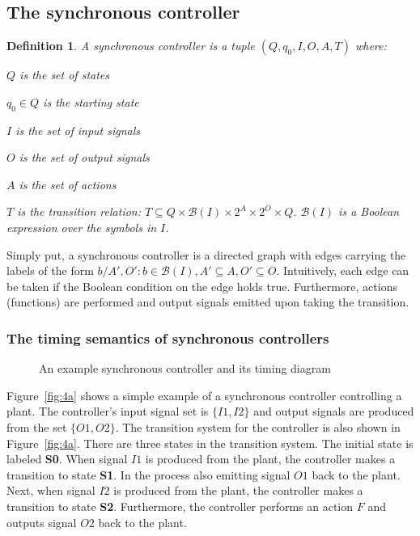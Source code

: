 \documentclass[10pt,journal,cspaper,compsoc]{IEEEtran}
\newtheorem{definition}{Definition}
\begin{document}
\subsection{The synchronous controller}
\label{sec:synchr-model-comp}

\begin{definition}
 A synchronous controller is a tuple $(Q,q_0,I,O,A,T)$ where:
 \begin{compactitem}
 \item $Q$ is the set of states
 \item $q_0 \in Q$ is the starting state
 \item $I$ is the set of input signals
 \item $O$ is the set of output signals
 \item $A$ is the set of actions
 \item $T$ is the transition relation: $T \subseteq Q \times
   \mathcal{B}(I) \times 2^A \times 2^O \times Q$. $\mathcal{B}(I)$ is a
   Boolean expression over the symbols in $I$.
 \end{compactitem}
\end{definition}

Simply put, a synchronous controller is a directed graph with edges
carrying the labels of the form $b/A',O': b \in \mathcal{B}(I), A'
\subseteq A, O' \subseteq O$. Intuitively, each edge can be taken if the
Boolean condition on the edge holds true. Furthermore, actions
(functions) are performed and output signals emitted upon taking the
transition.  

\subsubsection{The timing semantics of synchronous controllers}
\label{sec:timing-semant-synchr}

\begin{figure}[t!]
  \centering 
  \caption{An example synchronous controller and its timing diagram}
  \label{fig:4}
\end{figure}

Figure~\ref{fig:4a} shows a simple example of a synchronous controller
controlling a plant. The controller's input signal set is $\{I1, I2\}$
and output signals are produced from the set $\{O1, O2\}$. The
transition system for the controller is also shown in
Figure~\ref{fig:4a}. There are three states in the transition
system. The initial state is labeled \textbf{S0}. When signal $I1$ is
produced from the plant, the controller makes a transition to state
\textbf{S1}. In the process also emitting signal $O1$ back to the
plant. Next, when signal $I2$ is produced from the plant, the controller
makes a transition to state \textbf{S2}. Furthermore, the controller
performs an action $F$ and outputs signal $O2$ back to the plant.
\end{document}
